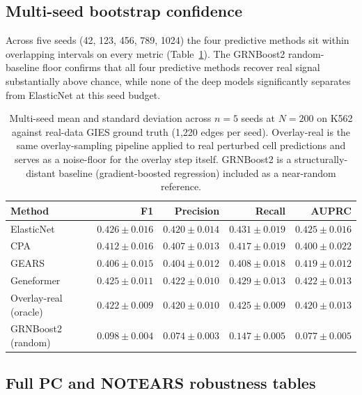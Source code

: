 \documentclass{article}
\begin{document}
\subsection{Multi-seed bootstrap confidence}
\label{app:multi_seed}

Across five seeds (42, 123, 456, 789, 1024) the four predictive methods sit within overlapping intervals on every metric (Table~\ref{tab:multiseed}). The GRNBoost2 random-baseline floor confirms that all four predictive methods recover real signal substantially above chance, while none of the deep models significantly separates from ElasticNet at this seed budget.

\begin{table}[h]
\centering
\small
\begin{tabular}{lrrrr}
\toprule
\textbf{Method} & \textbf{F1} & \textbf{Precision} & \textbf{Recall} & \textbf{AUPRC} \\
\midrule
ElasticNet            & $0.426 \pm 0.016$ & $0.420 \pm 0.014$ & $0.431 \pm 0.019$ & $0.425 \pm 0.016$ \\
CPA                   & $0.412 \pm 0.016$ & $0.407 \pm 0.013$ & $0.417 \pm 0.019$ & $0.400 \pm 0.022$ \\
GEARS                 & $0.406 \pm 0.015$ & $0.404 \pm 0.012$ & $0.408 \pm 0.018$ & $0.419 \pm 0.012$ \\
Geneformer            & $0.425 \pm 0.011$ & $0.422 \pm 0.010$ & $0.429 \pm 0.013$ & $0.422 \pm 0.013$ \\
Overlay-real (oracle) & $0.422 \pm 0.009$ & $0.420 \pm 0.010$ & $0.425 \pm 0.009$ & $0.420 \pm 0.013$ \\
GRNBoost2 (random)    & $0.098 \pm 0.004$ & $0.074 \pm 0.003$ & $0.147 \pm 0.005$ & $0.077 \pm 0.005$ \\
\bottomrule
\end{tabular}
\caption{Multi-seed mean and standard deviation across $n=5$ seeds at $N{=}200$ on K562 against real-data GIES ground truth (1{,}220 edges per seed). Overlay-real is the same overlay-sampling pipeline applied to real perturbed cell predictions and serves as a noise-floor for the overlay step itself. GRNBoost2 is a structurally-distant baseline (gradient-boosted regression) included as a near-random reference.}
\label{tab:multiseed}
\end{table}

\subsection{Full PC and NOTEARS robustness tables}
\label{app:pc_notears}
\end{document}
